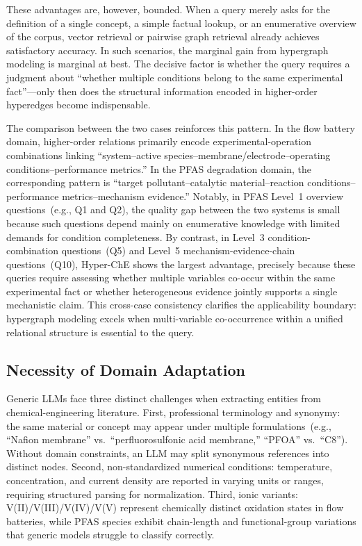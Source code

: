 \documentclass[11pt,a4paper]{article}
\begin{document}
These advantages are, however, bounded. When a query merely asks for the definition of a single concept, a simple factual lookup, or an enumerative overview of the corpus, vector retrieval or pairwise graph retrieval already achieves satisfactory accuracy. In such scenarios, the marginal gain from hypergraph modeling is marginal at best. The decisive factor is whether the query requires a judgment about ``whether multiple conditions belong to the same experimental fact''---only then does the structural information encoded in higher-order hyperedges become indispensable.

The comparison between the two cases reinforces this pattern. In the flow battery domain, higher-order relations primarily encode experimental-operation combinations linking ``system--active species--membrane/electrode--operating conditions--performance metrics.'' In the PFAS degradation domain, the corresponding pattern is ``target pollutant--catalytic material--reaction conditions--performance metrics--mechanism evidence.'' Notably, in PFAS Level~1 overview questions~(e.g., Q1 and Q2), the quality gap between the two systems is small because such questions depend mainly on enumerative knowledge with limited demands for condition completeness. By contrast, in Level~3 condition-combination questions~(Q5) and Level~5 mechanism-evidence-chain questions~(Q10), Hyper-ChE shows the largest advantage, precisely because these queries require assessing whether multiple variables co-occur within the same experimental fact or whether heterogeneous evidence jointly supports a single mechanistic claim. This cross-case consistency clarifies the applicability boundary: hypergraph modeling excels when multi-variable co-occurrence within a unified relational structure is essential to the query.

\subsection{Necessity of Domain Adaptation}

Generic LLMs face three distinct challenges when extracting entities from chemical-engineering literature. First, professional terminology and synonymy: the same material or concept may appear under multiple formulations~(e.g., ``Nafion membrane'' vs.~``perfluorosulfonic acid membrane,'' ``PFOA'' vs.~``C8''). Without domain constraints, an LLM may split synonymous references into distinct nodes. Second, non-standardized numerical conditions: temperature, concentration, and current density are reported in varying units or ranges, requiring structured parsing for normalization. Third, ionic variants: V(II)/V(III)/V(IV)/V(V) represent chemically distinct oxidation states in flow batteries, while PFAS species exhibit chain-length and functional-group variations that generic models struggle to classify correctly.
\end{document}
